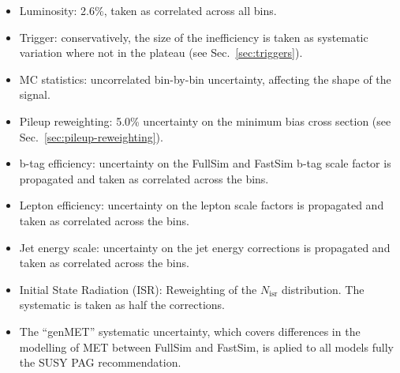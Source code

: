 \begin{itemize}
    \item Luminosity: 2.6\%, taken as correlated across all bins.
    \item Trigger: conservatively, the size of the inefficiency is taken as
        systematic variation where not in the plateau (see Sec.~\ref{sec:triggers}).
    \item MC statistics:  uncorrelated bin-by-bin uncertainty, affecting the
        shape of the signal.
    \item Pileup reweighting: 5.0\% uncertainty on the minimum bias cross section
        (see Sec.~\ref{sec:pileup-reweighting}).
    \item b-tag efficiency: uncertainty on the FullSim and FastSim b-tag scale
        factor is propagated and taken as correlated across the bins.
    \item Lepton efficiency: uncertainty on the lepton scale factors is
        propagated and taken as correlated across the bins.
    \item Jet energy scale: uncertainty on the jet energy corrections is
        propagated and taken as correlated across the bins.
    \item Initial State Radiation (ISR): Reweighting of the $N_{\text{isr}}$
        distribution. The systematic is taken as half the corrections.
    \item The ``genMET'' systematic uncertainty, which covers
      differences in the modelling of MET between FullSim and FastSim,
      is aplied to all models fully the SUSY PAG recommendation. 
\end{itemize}

